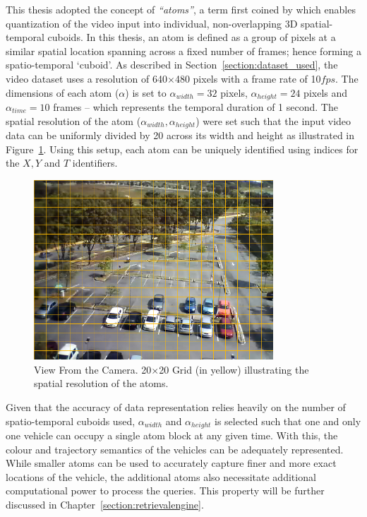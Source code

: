 This thesis adopted the concept of \textit{``atoms''}, a term first coined by \cite{castanon2016retrieval} which enables quantization of the video input into individual, non-overlapping 3D spatial-temporal cuboids. 
In this thesis, an atom is defined as a group of pixels at a similar spatial location spanning across a fixed number of frames; hence forming a spatio-temporal `cuboid'.
As described in Section~\ref{section:dataset_used}, the video dataset uses a resolution of 640$\times$480 pixels with a frame rate of 10$fps$.
The dimensions of each atom ($\alpha$) is set to $\alpha_{width}=32$ pixels, $\alpha_{height}=24$ pixels and $\alpha_{time}=10$ frames -- which represents the temporal duration of 1 second.
The spatial resolution of the atom ($\alpha_{width},\alpha_{height}$) were set such that the input video data can be uniformly divided by 20 across its width and height as illustrated in Figure~\ref{fig:viewfromcamera}. Using this setup, each atom can be uniquely identified using indices for the $X, Y$ and $T$ identifiers.
 
\begin{figure}[!tbh]\centering
\includegraphics[width=0.8\textwidth]{image/general/grids.png}
\caption{View From the Camera. 20$\times$20 Grid (in yellow) illustrating the spatial resolution of the atoms.}
\label{fig:viewfromcamera}
\end{figure}

Given that the accuracy of data representation relies heavily on the number of spatio-temporal cuboids used, $\alpha_{width}$ and $\alpha_{height}$ is selected such that one and only one vehicle can occupy a single atom block at any given time. With this, the colour and trajectory semantics of the vehicles can be adequately represented.
While smaller atoms can be used to accurately capture finer and more exact locations of the vehicle, the additional atoms also necessitate additional computational power to process the queries. This property will be further discussed in Chapter~\ref{section:retrievalengine}.

